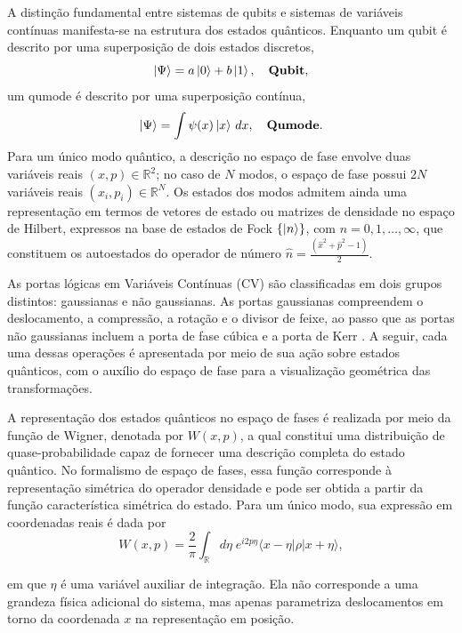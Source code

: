 A distinção fundamental entre sistemas de qubits e sistemas de variáveis contínuas manifesta-se na estrutura dos estados quânticos. Enquanto um qubit é descrito por uma superposição de dois estados discretos,
\begin{equation*}
    \ket{\Psi} = a\ket{0} + b\ket{1}, \quad \textbf{Qubit},
\end{equation*}
um qumode é descrito por uma superposição contínua,
\begin{equation*}
    \ket{\Psi} = \int \psi(x)\ket{x}\, dx, \quad \textbf{Qumode}.
\end{equation*}
Para um único modo quântico, a descrição no espaço de fase envolve duas variáveis reais $(x, p) \in \mathbb{R}^{2}$; no caso de $N$ modos, o espaço de fase possui $2N$ variáveis reais $(x_i, p_i) \in \mathbb{R}^{N}$. Os estados dos modos admitem ainda uma representação em termos de vetores de estado ou matrizes de densidade no espaço de Hilbert, expressos na base de estados de Fock $\{\ket{n}\}$, com $n = 0, 1, \ldots, \infty$, que constituem os autoestados do operador de número $\displaystyle\hat{n} = \frac{(\hat{x}^2 + \hat{p}^2 - 1)}{2}$.

As portas lógicas em Variáveis Contínuas (CV) são classificadas em dois grupos distintos: gaussianas e não gaussianas. As portas gaussianas compreendem o deslocamento, a compressão, a rotação e o divisor de feixe, ao passo que as portas não gaussianas incluem a porta de fase cúbica e a porta de Kerr \cite{fukui2022building, sharma2020characterizing, weedbrook2012gaussian, serafini_quantum_2023}. A seguir, cada uma dessas operações é apresentada por meio de sua ação sobre estados quânticos, com o auxílio do espaço de fase para a visualização geométrica das transformações. 

A representação dos estados quânticos no espaço de fases é realizada por meio da função de Wigner, denotada por $W(x,p)$, a qual constitui uma distribuição de quase-probabilidade capaz de fornecer uma descrição completa do estado quântico. No formalismo de espaço de fases, essa função corresponde à representação simétrica do operador densidade e pode ser obtida a partir da função característica simétrica do estado. Para um único modo, sua expressão em coordenadas reais é dada por
\begin{equation}
W(x,p)=\frac{2}{\pi}\int_{\mathbb{R}} d\eta \; e^{i2p\eta} \langle x-\eta|\rho|x+\eta\rangle,
\end{equation}

\noindent em que $\eta$ é uma variável auxiliar de integração. Ela não corresponde a uma grandeza física adicional do sistema, mas apenas parametriza deslocamentos em torno da coordenada $x$ na representação em posição.

